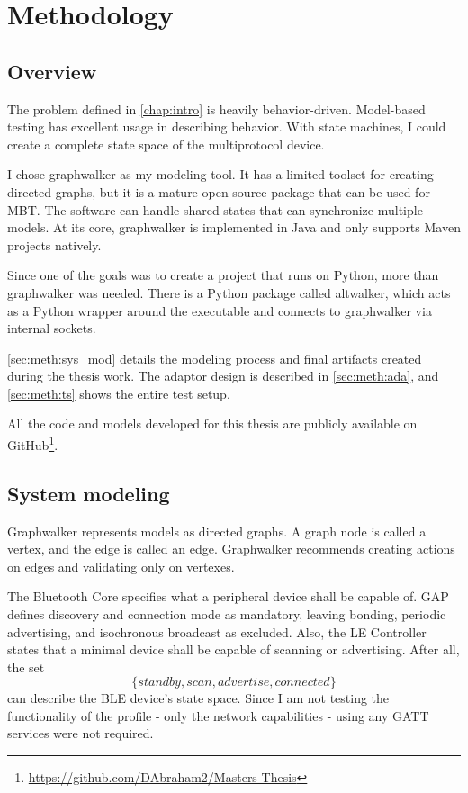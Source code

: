 \chapter{Methodology}
\label{chap:methodology}

\section{Overview}
\label{sec:meth:ov}

The problem defined in \autoref{chap:intro} is heavily behavior-driven. Model-based testing has excellent usage in describing behavior. With state machines, I could create a complete state space of the multiprotocol device.

I chose graphwalker as my modeling tool. It has a limited toolset for creating directed graphs, but it is a mature open-source package that can be used for MBT. The software can handle shared states that can synchronize multiple models. At its core, graphwalker is implemented in Java and only supports Maven projects natively. 

Since one of the goals was to create a project that runs on Python, more than graphwalker was needed. There is a Python package called altwalker, which acts as a Python wrapper around the executable and connects to graphwalker via internal sockets.

\autoref{sec:meth:sys_mod} details the modeling process and final artifacts created during the thesis work. The adaptor design is described in \autoref{sec:meth:ada}, and \autoref{sec:meth:ts} shows the entire test setup.

All the code and models developed for this thesis are publicly available on GitHub\footnote{\url{https://github.com/DAbraham2/Masters-Thesis}}.


\section{System modeling}
\label{sec:meth:sys_mod}

Graphwalker represents models as directed graphs. A graph node is called a vertex, and the edge is called an edge. Graphwalker recommends creating actions on edges and validating only on vertexes.

The Bluetooth Core specifies what a peripheral device shall be capable of. GAP defines discovery and connection mode as mandatory, leaving bonding, periodic advertising, and isochronous broadcast as excluded. Also, the LE Controller states that a minimal device shall be capable of scanning or advertising. After all, the set \[
    \{standby, scan, advertise, connected\}  
\] can describe the BLE device's state space. Since I am not testing the functionality of the profile - only the network capabilities - using any GATT services were not required.


